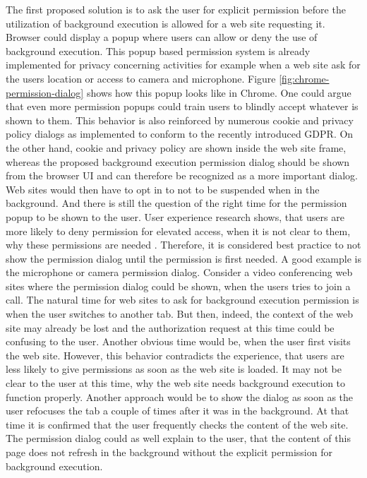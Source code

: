 \documentclass[
	ruledheaders=section,%
	class=report,%
	thesis={type=bachelor},%
	accentcolor=9c,%
	custommargins=true,%
	marginpar=false,%
	parskip=half-,%
	fontsize=11pt,%
]{tudapub}
\begin{document}
  The first proposed solution is to ask the user for explicit permission before the utilization of background execution is allowed for a web site requesting it. Browser could display a popup where users can allow or deny the use of background execution. This popup based permission system is already implemented for privacy concerning activities for example when a web site ask for the users location or access to camera and microphone. Figure \ref{fig:chrome-permission-dialog} shows how this popup looks like in Chrome. One could argue that even more permission popups could train users to blindly accept whatever is shown to them. This behavior is also reinforced by numerous cookie and privacy policy dialogs as implemented to conform to the recently introduced GDPR. On the other hand, cookie and privacy policy are shown inside the web site frame, whereas the proposed background execution permission dialog should be shown from the browser UI and can therefore be recognized as a more important dialog. Web sites would then have to opt in to not to be suspended when in the background. And there is still the question of the right time for the permission popup to be shown to the user. User experience research shows, that users are more likely to deny permission for elevated access, when it is not clear to them, why these permissions are needed \cite{bonne2017exploring}. Therefore, it is considered best practice to not show the permission dialog until the permission is first needed. A good example is the microphone or camera permission dialog. Consider a video conferencing web sites where the permission dialog could be shown, when the users tries to join a call. The natural time for web sites to ask for background execution permission is when the user switches to another tab. But then, indeed, the context of the web site may already be lost and the authorization request at this time could be confusing to the user. Another obvious time would be, when the user first visits the web site. However, this behavior contradicts the experience, that users are less likely to give permissions as soon as the web site is loaded. It may not be clear to the user at this time, why the web site needs background execution to function properly. Another approach would be to show the dialog as soon as the user refocuses the tab a couple of times after it was in the background. At that time it is confirmed that the user frequently checks the content of the web site. The permission dialog could as well explain to the user, that the content of this page does not refresh in the background without the explicit permission for background execution.
\end{document}
